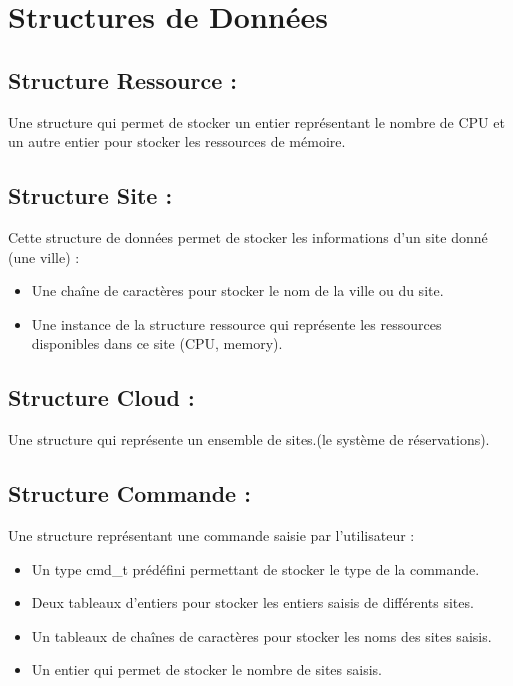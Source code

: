 \documentclass[oneside,13pt,a4paper]{article}
\begin{document}

\parskip=5pt



\parskip=5pt

\section{Structures de Données  }

\subsection{Structure Ressource : }
Une structure qui permet de stocker un entier représentant le nombre de CPU et un autre entier pour stocker les ressources de mémoire.
\subsection{Structure Site : }
Cette structure de données permet de stocker les informations d'un site donné (une ville) :

\begin{itemize}
	\item Une chaîne de caractères pour stocker le nom de la ville ou du site.
	\item Une instance de la structure ressource qui représente les ressources disponibles dans ce site (CPU, memory).
\end{itemize}
\subsection{Structure Cloud : }
Une structure qui représente un ensemble de sites.(le système de réservations).
\subsection{Structure Commande : }
Une structure représentant une commande saisie par l'utilisateur : 
\begin{itemize}
	\item Un type cmd\_t prédéfini permettant de stocker le type de la commande.
	\item Deux tableaux d'entiers pour stocker les entiers saisis de différents sites.
	\item Un tableaux de chaînes de caractères pour stocker les noms des sites saisis.
	\item Un entier qui permet de stocker le nombre de sites saisis.
\end{itemize}
\end{document}
